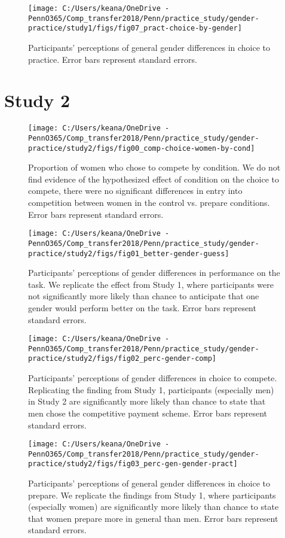 \documentclass[a4paper,nobind]{templates/ociamthesis}
\begin{document}
\begin{figure}
\texttt{[image: C:/Users/keana/OneDrive - PennO365/Comp\_transfer2018/Penn/practice\_study/gender-practice/study1/figs/fig07\_pract-choice-by-gender]} \caption{Participants' perceptions of general gender differences in choice to practice. Error bars represent standard errors.}\label{fig:s107}
\end{figure}

\hypertarget{study-2-1}{%
\section{Study 2}\label{study-2-1}}

\begin{figure}
\texttt{[image: C:/Users/keana/OneDrive - PennO365/Comp\_transfer2018/Penn/practice\_study/gender-practice/study2/figs/fig00\_comp-choice-women-by-cond]} \caption{Proportion of women who chose to compete by condition. We do not find evidence of the hypothesized effect of condition on the choice to compete, there were no significant differences in entry into competition between women in the control vs. prepare conditions. Error bars represent standard errors.}\label{fig:s200}
\end{figure}

\begin{figure}
\texttt{[image: C:/Users/keana/OneDrive - PennO365/Comp\_transfer2018/Penn/practice\_study/gender-practice/study2/figs/fig01\_better-gender-guess]} \caption{Participants' perceptions of gender differences in performance on the task. We replicate the effect from Study 1, where participants were not significantly more likely than chance to anticipate that one gender would perform better on the task. Error bars represent standard errors.}\label{fig:s201}
\end{figure}

\begin{figure}
\texttt{[image: C:/Users/keana/OneDrive - PennO365/Comp\_transfer2018/Penn/practice\_study/gender-practice/study2/figs/fig02\_perc-gender-comp]} \caption{Participants' perceptions of gender differences in choice to compete. Replicating the finding from Study 1, participants (especially men) in Study 2 are significantly more likely than chance to state that men chose the competitive payment scheme. Error bars represent standard errors.}\label{fig:s202}
\end{figure}

\begin{figure}
\texttt{[image: C:/Users/keana/OneDrive - PennO365/Comp\_transfer2018/Penn/practice\_study/gender-practice/study2/figs/fig03\_perc-gen-gender-pract]} \caption{Participants' perceptions of general gender differences in choice to prepare. We replicate the findings from Study 1, where participants (especially women) are significantly more likely than chance to state that women prepare more in general than men. Error bars represent standard errors.}\label{fig:s203}
\end{figure}
\end{document}
